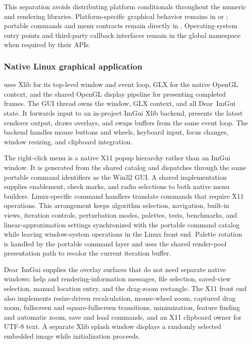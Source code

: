 This separation avoids distributing platform conditionals throughout the
numeric and rendering libraries. Platform-specific graphical behavior remains
in  or ; portable commands
and menu contracts remain directly in . Operating-system
entry points and third-party callback interfaces remain in the global namespace
when required by their APIs.

\subsubsection{Native Linux graphical application}
\label{subsec:linux-gui}

 uses Xlib for its top-level window and event loop,
GLX for the native OpenGL context, and the shared OpenGL display pipeline for
presenting completed frames. The GUI thread owns the window, GLX context, and
all Dear~ImGui state. It forwards input to an in-project ImGui Xlib backend,
presents the latest renderer output, draws overlays, and swaps buffers from the
same event loop. The backend handles mouse buttons and wheels, keyboard input,
focus changes, window resizing, and clipboard integration.

The right-click menu is a native X11 popup hierarchy rather than an ImGui
window. It is generated from the shared  catalog and dispatches
through the same portable command identifiers as the Win32 GUI. A shared
 implementation supplies enablement, check marks, and radio
selections to both native menu builders. Linux-specific command handlers
translate commands that require X11 operations. This arrangement keeps algorithm selection,
navigation, built-in views, iteration controls, perturbation modes, palettes,
tests, benchmarks, and linear-approximation settings synchronized with the
portable command catalog while leaving window-system operations in the Linux
front end. Palette rotation is handled by the portable command layer and uses
the shared render-pool presentation path to recolor the current iteration
buffer.

Dear~ImGui supplies the overlay surfaces that do not need separate native
windows: help and rendering-information messages, file selection, saved-view
selection, manual location entry, and the drag-zoom rectangle. The X11 front
end also implements resize-driven recalculation, mouse-wheel zoom, captured
drag zoom, fullscreen and square-fullscreen transitions, minimization, feature
finding and automatic zoom, save and load commands, and an X11 clipboard owner
for UTF-8 text. A separate Xlib splash window displays a randomly selected
embedded image while initialization proceeds.

